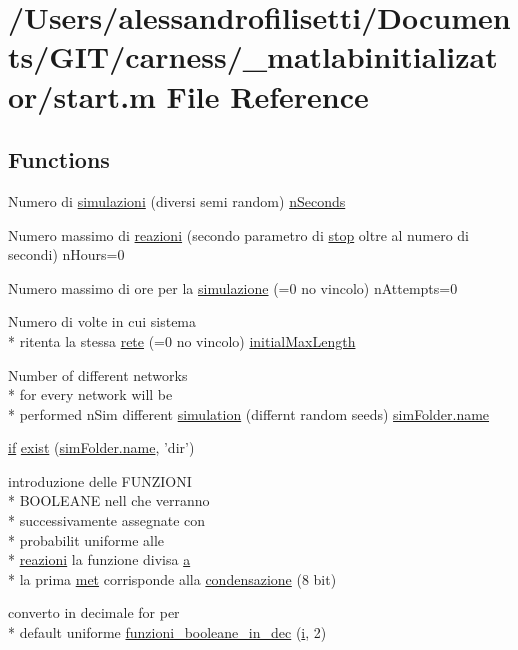 \hypertarget{a00071}{\section{/\-Users/alessandrofilisetti/\-Documents/\-G\-I\-T/carness/\-\_\-matlabinitializator/start.m File Reference}
\label{a00071}
}
\subsection*{Functions}
\begin{DoxyCompactItemize}
\item 
Numero di \hyperlink{a00071_a1b273eb41d82b5ca6c9f74a3c0aa2855}{simulazioni} (diversi semi random) \hyperlink{a00070_aaded2f2d61413dc4bddf805e9be03ded}{n\-Seconds}
\item 
Numero massimo di \hyperlink{a00071_a69962f56e60d0c88abc5d4b6839c2886}{reazioni} (secondo parametro di \hyperlink{a00030_a6bd08e37edf4151f5f6d1fc27a6f227a}{stop} oltre al numero di secondi) n\-Hours=0
\item 
Numero massimo di ore per la \hyperlink{a00071_ad4ff287bf077be8ffb479fcc197bc548}{simulazione} (=0 no vincolo) n\-Attempts=0
\item 
Numero di volte in cui sistema \\*
ritenta la stessa \hyperlink{a00071_a40d2922f55b48d94c99038a8c2bef2ff}{rete} (=0 no vincolo) \hyperlink{a00070_a4c7433c24b6426a15069cc5a93a5cbec}{initial\-Max\-Length}
\item 
Number of different networks \\*
for every network will be \\*
performed n\-Sim different \hyperlink{a00071_a096e1441156fd2c744baece86d6b295c}{simulation} (differnt random seeds) \hyperlink{a00027_abbf559a76fab59203496b0847ab9502a}{sim\-Folder.\-name}
\item 
\hyperlink{a00030_a01d55766b8058903dd360b4bda71f9f5}{if} \hyperlink{a00071_acda334cb7ae2a2f83fa0ec9c6f57a846}{exist} (\hyperlink{a00027_abbf559a76fab59203496b0847ab9502a}{sim\-Folder.\-name}, 'dir')
\item 
introduzione delle F\-U\-N\-Z\-I\-O\-N\-I \\*
B\-O\-O\-L\-E\-A\-N\-E nell che verranno \\*
successivamente assegnate con \\*
probabilit uniforme alle \\*
\hyperlink{a00071_a69962f56e60d0c88abc5d4b6839c2886}{reazioni} la funzione divisa \hyperlink{a00035_a2ffdbad9ea59541e59cbd2b938e0770c}{a} \\*
la prima \hyperlink{a00071_a53f2a5c181e46a513a4e87f144d19f6b}{met} corrisponde alla \hyperlink{a00071_a8c8df28fc47986989fead7fb4ee1a3ea}{condensazione} (8 bit)
\item 
converto in decimale for per \\*
default uniforme \hyperlink{a00071_aca80ac3e93dabd95e623a51f90fb37b6}{funzioni\-\_\-booleane\-\_\-in\-\_\-dec} (\hyperlink{a00071_ad3efca1ea6e3333daf30719ee0501862}{i}, 2)
\end{DoxyCompactItemize}
